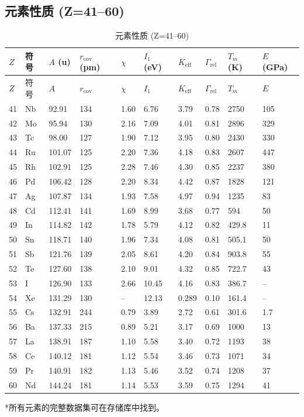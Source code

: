 \documentclass[12pt,a4paper]{article}
\newcommand{\Keff}{K_{\mathrm{eff}}}
\begin{document}
	\subsection*{元素性质 (Z=41–60)}
	
	\begin{longtable}{p{0.6cm}p{1.2cm}p{1.2cm}p{1.2cm}p{1.2cm}p{1.2cm}p{1.5cm}p{1.2cm}p{1.2cm}p{1.2cm}}
		\caption{元素性质 (Z=41–60)} \label{tab:elem-data-41to60} \\
		\toprule
		\(Z\) & 符号 & \(A\) (u) & \(r_{\text{cov}}\) (pm) & \(\chi\) & \(I_1\) (eV) & \(\Keff\) & \(\Gamma_{\text{rel}}\) & \(T_m\) (K) & \(E\) (GPa) \\
		\midrule
		\endfirsthead
		\toprule
		\(Z\) & 符号 & \(A\) & \(r_{\text{cov}}\) & \(\chi\) & \(I_1\) & \(\Keff\) & \(\Gamma_{\text{rel}}\) & \(T_m\) & \(E\) \\
		\midrule
		\endhead
		41 & Nb & 92.91 & 134 & 1.60 & 6.76 & 3.79 & 0.78 & 2750 & 105 \\
		42 & Mo & 95.94 & 130 & 2.16 & 7.09 & 4.01 & 0.81 & 2896 & 329 \\
		43 & Tc & 98.00 & 127 & 1.90 & 7.12 & 3.95 & 0.80 & 2430 & 330 \\
		44 & Ru & 101.07 & 125 & 2.20 & 7.36 & 4.18 & 0.83 & 2607 & 447 \\
		45 & Rh & 102.91 & 125 & 2.28 & 7.46 & 4.30 & 0.85 & 2237 & 380 \\
		46 & Pd & 106.42 & 128 & 2.20 & 8.34 & 4.42 & 0.87 & 1828 & 121 \\
		47 & Ag & 107.87 & 134 & 1.93 & 7.58 & 4.97 & 0.94 & 1235 & 83 \\
		48 & Cd & 112.41 & 141 & 1.69 & 8.99 & 3.68 & 0.77 & 594 & 50 \\
		49 & In & 114.82 & 142 & 1.78 & 5.79 & 4.12 & 0.82 & 429.8 & 11 \\
		50 & Sn & 118.71 & 140 & 1.96 & 7.34 & 4.08 & 0.81 & 505.1 & 50 \\
		51 & Sb & 121.76 & 139 & 2.05 & 8.61 & 4.20 & 0.84 & 903.8 & 55 \\
		52 & Te & 127.60 & 138 & 2.10 & 9.01 & 4.32 & 0.85 & 722.7 & 43 \\
		53 & I  & 126.90 & 133 & 2.66 & 10.45 & 4.16 & 0.83 & 386.7 & – \\
		54 & Xe & 131.29 & 130 & –    & 12.13 & 0.289 & 0.10 & 161.4 & – \\
		55 & Cs & 132.91 & 244 & 0.79 & 3.89 & 2.72 & 0.61 & 301.6 & 1.7 \\
		56 & Ba & 137.33 & 215 & 0.89 & 5.21 & 3.17 & 0.69 & 1000 & 13 \\
		57 & La & 138.91 & 187 & 1.10 & 5.58 & 3.40 & 0.72 & 1193 & 38 \\
		58 & Ce & 140.12 & 181 & 1.12 & 5.54 & 3.46 & 0.73 & 1071 & 34 \\
		59 & Pr & 140.91 & 182 & 1.13 & 5.46 & 3.52 & 0.74 & 1208 & 37 \\
		60 & Nd & 144.24 & 181 & 1.14 & 5.53 & 3.59 & 0.75 & 1294 & 41 \\
		\bottomrule
	\end{longtable}
	*所有元素的完整数据集可在存储库中找到。
	
\end{document}
